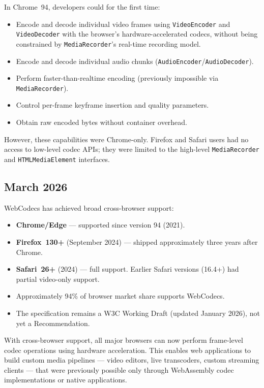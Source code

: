\documentclass[11pt]{article}
\begin{document}
In Chrome~94, developers could for the first time:
\begin{itemize}
  \item Encode and decode individual video frames using
    \texttt{VideoEncoder} and \texttt{VideoDecoder} with the browser's
    hardware-accelerated codecs, without being constrained by
    \texttt{MediaRecorder}'s real-time recording model.
  \item Encode and decode individual audio chunks
    (\texttt{AudioEncoder}/\texttt{AudioDecoder}).
  \item Perform faster-than-realtime encoding (previously impossible via
    \texttt{MediaRecorder}).
  \item Control per-frame keyframe insertion and quality parameters.
  \item Obtain raw encoded bytes without container overhead.
\end{itemize}

However, these capabilities were Chrome-only. Firefox and Safari users had no
access to low-level codec APIs; they were limited to the high-level
\texttt{MediaRecorder} and \texttt{HTMLMediaElement} interfaces.

\subsection{March 2026}

WebCodecs has achieved broad cross-browser support:

\begin{itemize}
  \item \textbf{Chrome/Edge} --- supported since version 94 (2021).
  \item \textbf{Firefox~130+} (September 2024) --- shipped approximately three
    years after Chrome.
  \item \textbf{Safari~26+} (2024) --- full support. Earlier Safari versions
    (16.4+) had partial video-only support.
  \item Approximately 94\% of browser market share supports WebCodecs.
  \item The specification remains a W3C Working Draft (updated January 2026),
    not yet a Recommendation.
\end{itemize}

With cross-browser support, all major browsers can now perform frame-level
codec operations using hardware acceleration. This enables web applications
to build custom media pipelines --- video editors, live transcoders, custom
streaming clients --- that were previously possible only through WebAssembly
codec implementations or native applications.
\end{document}
